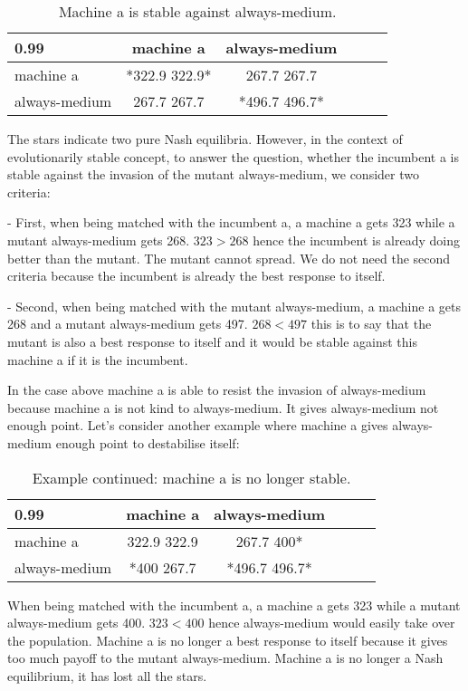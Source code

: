 \documentclass[12.5pt]{report}
\begin{document}
\begin{table}[h!]
\center
\begin{tabular}{l|ccccc}
\textbf{0.99}& machine a & always-medium \\
\hline
machine a & *322.9 322.9* &   267.7 267.7   \\
always-medium  &  267.7 267.7  &    *496.7 496.7*  \\
\end{tabular}
\caption{Machine a is stable against always-medium.}
\end{table}

The stars indicate two pure Nash equilibria. However, in the context of evolutionarily stable concept, to answer the question, whether the incumbent a is stable against the invasion of the mutant always-medium, we consider two criteria:

- First, when being matched with the incumbent a, a machine a gets 323 while a mutant always-medium gets 268. $323 > 268$ hence the incumbent is already doing better than the mutant. The mutant cannot spread. We do not need the second criteria because the incumbent is already the best response to itself.

- Second, when being matched with the mutant always-medium, a machine a gets 268 and a mutant always-medium gets 497. $268 < 497$ this is to say that the mutant is also a best response to itself and it would be stable against this machine a if it is the incumbent.

In the case above machine a is able to resist the invasion of always-medium because machine a is not kind to always-medium. It gives always-medium not enough point. Let's consider another example where machine a gives always-medium enough point to destabilise itself:

\begin{table}[h!]
\center
\begin{tabular}{l|ccccc}
\textbf{0.99}& machine a & always-medium \\
\hline
machine a & 322.9 322.9 &   267.7 400*   \\
always-medium  &  *400 267.7  &    *496.7 496.7*  \\
\end{tabular}
\caption{Example continued: machine a is no longer stable.}
\end{table}

When being matched with the incumbent a, a machine a gets 323 while a mutant always-medium gets 400. $323 < 400$ hence always-medium would easily take over the population. Machine a is no longer a best response to itself because it gives too much payoff to the mutant always-medium. Machine a is no longer a Nash equilibrium, it has lost all the stars.
\end{document}
